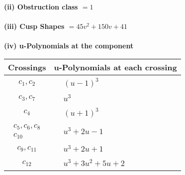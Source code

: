 \documentclass[1p]{elsarticle_modified}
\theoremstyle{definition}
\begin{document}
\flushleft \textbf{(ii) Obstruction class $= 1$}\\~\\
\flushleft \textbf{(iii) Cusp Shapes $= 45 v^2+150 v+41$}\\~\\
\newpage\renewcommand{\arraystretch}{1}
\flushleft \textbf{(iv) u-Polynomials at the component}\newline \\
\begin{tabular}{m{50pt}|m{274pt}}
Crossings & \hspace{64pt}u-Polynomials at each crossing \\
\hline $$\begin{aligned}c_{1},c_{2}\end{aligned}$$&$\begin{aligned}
&(u-1)^3
\end{aligned}$\\
\hline $$\begin{aligned}c_{3},c_{7}\end{aligned}$$&$\begin{aligned}
&u^3
\end{aligned}$\\
\hline $$\begin{aligned}c_{4}\end{aligned}$$&$\begin{aligned}
&(u+1)^3
\end{aligned}$\\
\hline $$\begin{aligned}c_{5},c_{6},c_{8}\\c_{10}\end{aligned}$$&$\begin{aligned}
&u^3+2 u-1
\end{aligned}$\\
\hline $$\begin{aligned}c_{9},c_{11}\end{aligned}$$&$\begin{aligned}
&u^3+2 u+1
\end{aligned}$\\
\hline $$\begin{aligned}c_{12}\end{aligned}$$&$\begin{aligned}
&u^3+3 u^2+5 u+2
\end{aligned}$\\
\hline
\end{tabular}\\~\\
\end{document}
